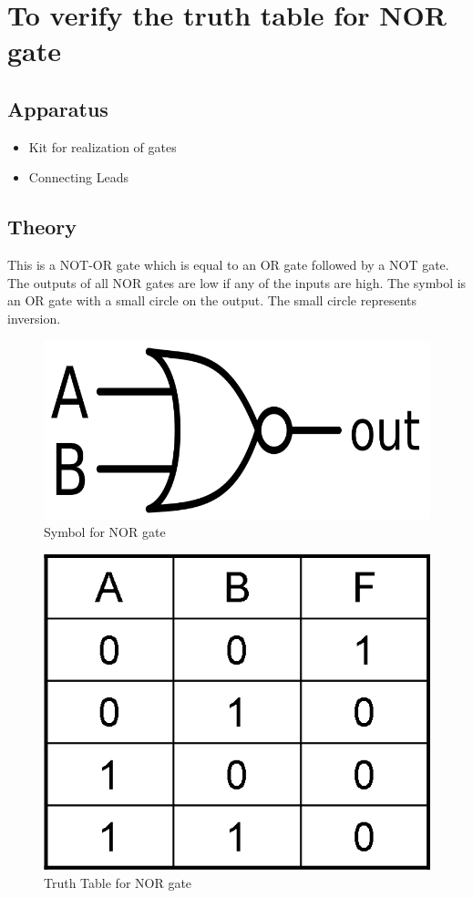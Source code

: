 \chapter{To verify the truth table for NOR gate}

\section{Apparatus}
	\begin{itemize}
		\tightlist
		\item Kit for realization of gates
		\item Connecting Leads
	\end{itemize}

\section{Theory}
	This is a NOT-OR gate which is equal to an OR gate followed by a NOT gate. The outputs of all NOR gates are low if any of the inputs are high. The symbol is an OR gate with a small circle on the output. The small circle represents inversion.
	\begin{figure}[h]
		\centering
		\includegraphics{img/exp5/1}
		\caption{Symbol for NOR gate}
		\label{fig:5:1}
	\end{figure}
	\begin{figure}[h]
		\centering
		\includegraphics{img/exp5/2}
		\caption{Truth Table for NOR gate}
		\label{fig:5:2}
	\end{figure}
	
